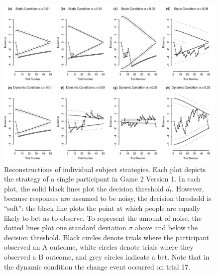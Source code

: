 \documentclass[authoryear]{elsarticle}
\begin{document}
\begin{figure}[p]
\begin{center}
\includegraphics[scale=.5]{indChoice.pdf}
\caption{Reconstructions of individual subject strategies. Each plot depicts the strategy of a single participant in Game 2 Version 1. In each plot, the solid black lines plot the decision threshold $d_t$. However, because responses are assumed to be noisy, the decision threshold is ``soft'': the black line plots the point at which people are equally likely to bet as to observe. To represent the amount of noise, the dotted lines plot one standard deviation $\sigma$ above and below the decision threshold. Black circles denote trials where the participant observed an A outcome, white circles denote trials where they observed a B outcome, and grey circles indicate a bet. Note that in the dynamic condition the change event occurred on trial 17.}
\label{fig:indChoice}
\end{center}
\end{figure}
\end{document}
